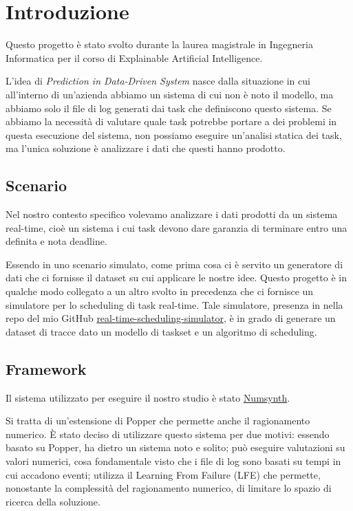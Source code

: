 \chapter{Introduzione}
Questo progetto è stato svolto durante la laurea magistrale in Ingegneria Informatica per il corso di Explainable Artificial Intelligence.

L'idea di \textit{Prediction in Data-Driven System} nasce dalla situazione in cui all'interno di un'azienda abbiamo un sistema di cui non è noto il modello, ma abbiamo solo il file di log generati dai task che definiscono questo sistema. Se abbiamo la necessità di valutare quale task potrebbe portare a dei problemi in questa esecuzione del sistema, non possiamo eseguire un'analisi statica dei task, ma l'unica soluzione è analizzare i dati che questi hanno prodotto.

\section{Scenario}
Nel nostro contesto specifico volevamo analizzare i dati prodotti da un sistema real-time, cioè un sistema i cui task devono dare garanzia di terminare entro una definita e nota deadline.

Essendo in uno scenario simulato, come prima cosa ci è servito un generatore di dati che ci fornisse il dataset su cui applicare le nostre idee. Questo progetto è in qualche modo collegato a un altro svolto in precedenza che ci fornisce un simulatore per lo scheduling di task real-time. Tale simulatore, presenza in nella repo del mio GitHub \href{https://github.com/edoardosarri24/real-time-scheduling-simulator}{real-time-scheduling-simulator}, è in grado di generare un dataset di tracce dato un modello di taskset e un algoritmo di scheduling.

\section{Framework}
Il sistema utilizzato per eseguire il nostro studio è stato \href{https://github.com/celinehocquette/numsynth-aaai23}{Numsynth}.

Si tratta di un'estensione di Popper che permette anche il ragionamento numerico. È stato deciso di utilizzare questo sistema per due motivi: essendo basato su Popper, ha dietro un sistema noto e solito; può eseguire valutazioni su valori numerici, cosa fondamentale visto che i file di log sono basati su tempi in cui accadono eventi; utilizza il Learning From Failure (LFE) che permette, nonostante la complessità del ragionamento numerico, di limitare lo spazio di ricerca della soluzione.

